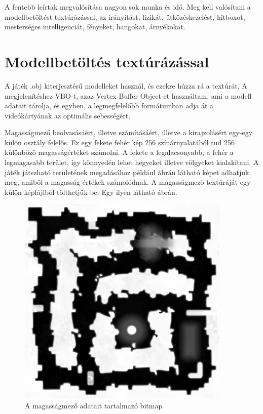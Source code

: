 A fentebb leírtak megvalósítása nagyon sok munka és idő. Meg kell valósítani a modellbetöltést textúrázással, az irányítást, fizikát, ütközéskezelést, hitboxot, mesterséges intelligenciát, fényeket, hangokat, árnyékokat.

\section{Modellbetöltés textúrázással}

A játék .obj kiterjesztésű modelleket használ, és ezekre húzza rá a textúrát. A megjelenítéshez VBO-t, azaz Vertex Buffer Object-et használtam, ami a modell adatait tárolja, és egyben, a legmegfelelőbb formátumban adja át a videókártyának az optimális sebességért.

Magasságmező beolvasásáért, illetve számításáért, illetve a kirajzolásért egy-egy külön osztály felelős. Ez egy fekete fehér kép 256 színárnyalatából tud 256 különböző magasságértéket számolni. A fekete a legalacsonyabb, a fehér a legmagasabb terület, így könnyedén lehet hegyeket illetve völgyeket kialakítani. A játék játszható területének megadásához például  ábrán látható képet adhatjuk meg, amiből a magasság értékek számolódnak. A magasságmező textúráját egy külön képfájlból tölthetjük be. Egy ilyen látható  ábrán.

\begin{figure}[h]
\centering
\includegraphics[scale=0.7]{kepek/heightmap.png}
\caption{A magasságmező adatait tartalmazó bitmap}
\label{fig:heightmap}
\end{figure}

